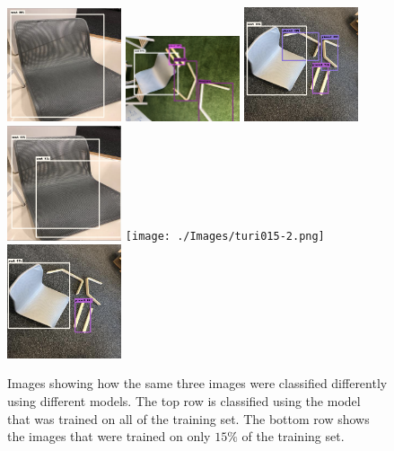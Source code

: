 \begin{figure}[h]
\begin{center}
\includegraphics[width = 0.3\textwidth, height = 0.3\textwidth]{./Images/turi100-1.png}
\includegraphics[width = 0.3\textwidth, height = 0.3\textwidth]{./Images/turi100-2.png}
\includegraphics[width = 0.3\textwidth, height = 0.3\textwidth]{./Images/turi100-3.png}
\includegraphics[width = 0.3\textwidth, height = 0.3\textwidth]{./Images/turi015-1.png}
\texttt{[image: ./Images/turi015-2.png]}
\includegraphics[width = 0.3\textwidth, height = 0.3\textwidth]{./Images/turi015-3.png}
\caption{Images showing how the same three images were classified differently using different models. The top row is classified using the model that was trained on all of the training set. The bottom row shows the images that were trained on only $ 15 \% $ of the training set. }
\label{fig:mAPExamples}
\end{center}
\end{figure}


